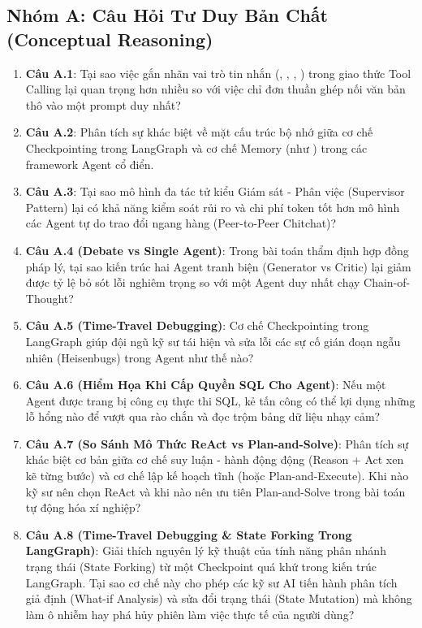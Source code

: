 \subsection{Nhóm A: Câu Hỏi Tư Duy Bản Chất (Conceptual Reasoning)}
\begin{enumerate}
  \item \textbf{Câu A.1}: Tại sao việc gắn nhãn vai trò tin nhắn (, , , ) trong giao thức Tool Calling lại quan trọng hơn nhiều so với việc chỉ đơn thuần ghép nối văn bản thô vào một prompt duy nhất?
  \item \textbf{Câu A.2}: Phân tích sự khác biệt về mặt cấu trúc bộ nhớ giữa cơ chế Checkpointing trong LangGraph và cơ chế Memory (như ) trong các framework Agent cổ điển.
  \item \textbf{Câu A.3}: Tại sao mô hình đa tác tử kiểu Giám sát - Phân việc (Supervisor Pattern) lại có khả năng kiểm soát rủi ro và chi phí token tốt hơn mô hình các Agent tự do trao đổi ngang hàng (Peer-to-Peer Chitchat)?
  \item \textbf{Câu A.4 (Debate vs Single Agent)}: Trong bài toán thẩm định hợp đồng pháp lý, tại sao kiến trúc hai Agent tranh biện (Generator vs Critic) lại giảm được tỷ lệ bỏ sót lỗi nghiêm trọng so với một Agent duy nhất chạy Chain-of-Thought?
  \item \textbf{Câu A.5 (Time-Travel Debugging)}: Cơ chế Checkpointing trong LangGraph giúp đội ngũ kỹ sư tái hiện và sửa lỗi các sự cố gián đoạn ngẫu nhiên (Heisenbugs) trong Agent như thế nào?
  \item \textbf{Câu A.6 (Hiểm Họa Khi Cấp Quyền SQL Cho Agent)}: Nếu một Agent được trang bị công cụ thực thi SQL, kẻ tấn công có thể lợi dụng những lỗ hổng nào để vượt qua rào chắn và đọc trộm bảng dữ liệu nhạy cảm?
  \item \textbf{Câu A.7 (So Sánh Mô Thức ReAct vs Plan-and-Solve)}: Phân tích sự khác biệt cơ bản giữa cơ chế suy luận - hành động động  (Reason + Act xen kẽ từng bước) và cơ chế lập kế hoạch tĩnh  (hoặc Plan-and-Execute). Khi nào kỹ sư nên chọn ReAct và khi nào nên ưu tiên Plan-and-Solve trong bài toán tự động hóa xí nghiệp?
  \item \textbf{Câu A.8 (Time-Travel Debugging \& State Forking Trong LangGraph)}: Giải thích nguyên lý kỹ thuật của tính năng phân nhánh trạng thái (State Forking) từ một Checkpoint quá khứ trong kiến trúc LangGraph. Tại sao cơ chế này cho phép các kỹ sư AI tiến hành phân tích giả định (What-if Analysis) và sửa đổi trạng thái (State Mutation) mà không làm ô nhiễm hay phá hủy phiên làm việc thực tế của người dùng?
\end{enumerate}

